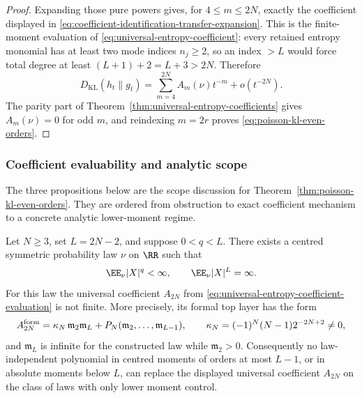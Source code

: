 \begin{proof}
Expanding those pure powers gives, for \(4\le m\le2N\), exactly the coefficient
displayed in
\eqref{eq:coefficient-identification-transfer-expansion}.  This is the
finite-moment evaluation of
\eqref{eq:universal-entropy-coefficient}: every retained entropy monomial has
at least two mode indices \(n_j\ge2\), so an index \(>L\) would force total
degree at least \((L+1)+2=L+3>2N\).  Therefore
\[
D_{\mathrm{KL}}(h_t\|g_t)
=\sum_{m=4}^{2N}A_m(\nu)t^{-m}+o(t^{-2N}).
\]
The parity part of Theorem~\ref{thm:universal-entropy-coefficients} gives
\(A_m(\nu)=0\) for odd \(m\), and reindexing \(m=2r\) proves
\eqref{eq:poisson-kl-even-orders}.
\end{proof}

\subsubsection{Coefficient evaluability and analytic scope}%
\label{subsubsec:finite-moment-threshold-scope}

The three propositions below are the scope discussion for
Theorem~\ref{thm:poisson-kl-even-orders}.  They are ordered from obstruction
to exact coefficient mechanism to a concrete analytic lower-moment regime.

\begin{proposition}%
\label{prop:analytic-first-evaluability-obstruction}
Let \(N\ge3\), set \(L=2N-2\), and suppose \(0<q<L\).  There exists a
centred symmetric probability law \(\nu\) on \(\RR\) such that
\[
\EE_\nu |X|^q<\infty,
\qquad
\EE_\nu |X|^L=\infty .
\]
For this law the universal coefficient \(A_{2N}\) from
\eqref{eq:universal-entropy-coefficient-evaluation} is not finite.  More
precisely, its formal top layer has the form
\begin{equation}\label{eq:analytic-obstruction-top-term}
A_{2N}^{\rm form}
=\kappa_N\,\mathfrak m_2\mathfrak m_L
+P_N(\mathfrak m_2,\ldots,\mathfrak m_{L-1}),
\qquad
\kappa_N=(-1)^N(N-1)2^{-2N+2}\ne0,
\end{equation}
and \(\mathfrak m_L\) is infinite for the constructed law while
\(\mathfrak m_2>0\).  Consequently no law-independent polynomial in centred
moments of orders at most \(L-1\), or in absolute moments below \(L\), can
replace the displayed universal coefficient \(A_{2N}\) on the class of laws
with only lower moment control.
\end{proposition}

